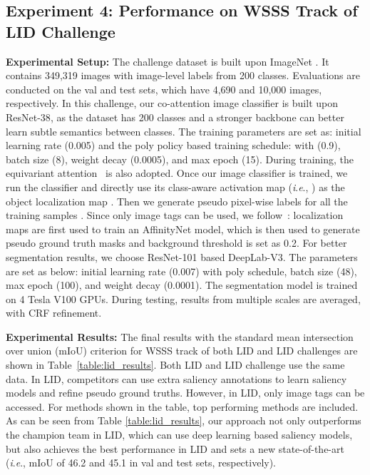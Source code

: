 \documentclass[runningheads]{llncs}
\newcommand{\ie}{\textit{i}.\textit{e}.}
\begin{document}
\subsection{Experiment 4: Performance on WSSS Track of LID Challenge} \label{sec:challenge}
\noindent\textbf{Experimental Setup:} The challenge dataset \cite{lid2020} is built upon ImageNet \cite{russakovsky2015imagenet}. It contains 349,319 images with image-level labels from 200 classes. Evaluations are conducted on the val and test sets, which have 4,690 and 10,000 images, respectively. In this challenge, our co-attention image classifier is built upon ResNet-38\cite{wu2019wider}, as the dataset has 200 classes and a stronger backbone can better learn subtle semantics between classes. The training parameters are set as: initial learning rate (0.005) and the poly policy based training schedule:  with (0.9), batch size (8), weight decay (0.0005), and max epoch (15). During training, the equivariant attention~\cite{seam} is also adopted. Once our image classifier is trained, we run the classifier and directly use its class-aware activation map (\ie, ) as the object localization map . Then we generate pseudo pixel-wise labels for all the training samples . Since only image tags can be used, we follow\!~\cite{psa2018}: localization maps are first used to train an AffinityNet model, which is then used to generate pseudo ground truth masks and background threshold is set as 0.2. For better segmentation results, we choose ResNet-101 based DeepLab-V3. The parameters are set as below: initial learning rate (0.007) with poly schedule, batch size (48), max epoch (100), and weight decay (0.0001). The segmentation model is trained on 4 Tesla V100 GPUs. During testing, results from multiple scales are averaged, with CRF refinement.

\noindent\textbf{Experimental Results:} The final results with the standard mean intersection over union (mIoU) criterion for WSSS track of both LID and LID challenges are shown in Table\!~\ref{table:lid_results}. Both LID and LID challenge use the same data. In LID, competitors can use extra saliency annotations to learn saliency models and refine pseudo ground truths. However, in LID, only image tags can be accessed. For methods shown in the table, top performing methods are included. As can be seen from Table \ref{table:lid_results}, our approach not only outperforms the champion team in LID, which can use deep learning based saliency models, but also achieves the best performance in LID and sets a new state-of-the-art (\ie, mIoU of 46.2 and 45.1 in val and test sets, respectively). 
\end{document}
